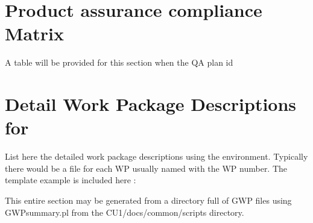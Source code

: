 \documentclass[DM,lsstdraft,SDP]{lsstdoc}
\begin{document}
\appendix

\section{Product assurance compliance Matrix \label{sect:compmat}}
A table will be provided for this section when the QA plan id

\section {Detail Work Package Descriptions for \CU \label{sect:wpds}}
List here the detailed work package descriptions using the 
environment. Typically there would be a file for each WP usually named
with the WP number. The template example is included here :



This entire section may be generated from a directory full of GWP files
using GWPsummary.pl from the CU1/docs/common/scripts directory.
\end{document}
